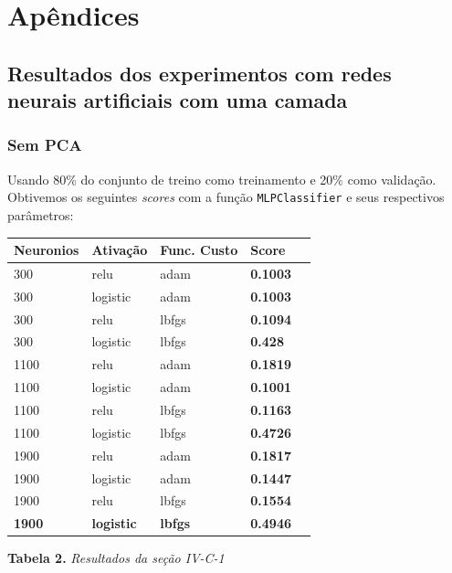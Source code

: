 \documentclass[conference]{IEEEtran}
\begin{document}
\section{Apêndices}

\subsection{Resultados dos experimentos com redes neurais artificiais com uma camada}
\subsubsection{Sem PCA}
Usando 80\% do conjunto de treino como treinamento e 20\% como validação. Obtivemos os seguintes \textit{scores} com a função \texttt{MLPClassifier} e seus respectivos parâmetros:

\begin{center}

\begin{tabular}{| l | l | l | l | l |}
\hline
\textbf{Neuronios} & \textbf{Ativação} & \textbf{Func. Custo} & \textbf{Score}  \\ \hline
300       & relu     & adam        & \textbf{0.1003} \\ \hline
300       & logistic & adam        & \textbf{0.1003} \\ \hline
300       & relu     & lbfgs       & \textbf{0.1094} \\ \hline
300       & logistic & lbfgs       & \textbf{0.428}  \\ \hline
1100      & relu     & adam        & \textbf{0.1819} \\ \hline
1100      & logistic & adam        & \textbf{0.1001} \\ \hline
1100      & relu     & lbfgs       & \textbf{0.1163} \\ \hline
1100      & logistic & lbfgs       & \textbf{0.4726} \\ \hline
1900      & relu     & adam        & \textbf{0.1817} \\ \hline
1900      & logistic & adam        & \textbf{0.1447 }\\ \hline
1900      & relu     & lbfgs       & \textbf{0.1554} \\ \hline
\textbf{1900}      & \textbf{logistic} & \textbf{lbfgs}       & \textbf{0.4946 }\\ \hline
\end{tabular} 
\newline
\newline
\textbf{Tabela 2.} \textit{Resultados da seção IV-C-1}
\end{center}
\end{document}
